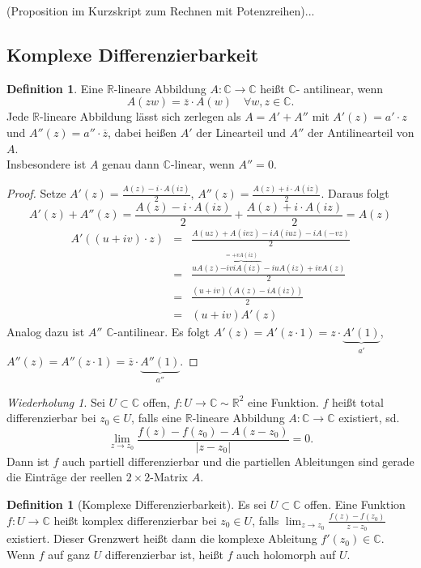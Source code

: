 \documentclass[11pt,titlepage]{article}
\theoremstyle{definition}
\newtheorem{definition}[theorem]{Definition}
\theoremstyle{remark}
\newtheorem*{repetition}{Wiederholung}
\begin{document}
	(Proposition im Kurzskript zum Rechnen mit Potenzreihen)...
	
	\subsection{Komplexe Differenzierbarkeit}
	
	\begin{definition}
		Eine $\mathbb{R}$-lineare Abbildung $A:\mathbb{C}\to \mathbb{C}$ heißt $\mathbb{C}$-
		antilinear, wenn
		\[ A(zw)=\overline{z} \cdot A(w) \quad \forall w,z\in\mathbb{C}. \]
		Jede $\mathbb{R}$-lineare Abbildung lässt sich zerlegen als $A=A'+A''$ mit 
		$A'(z)=a'\cdot z$ und $A''(z)=a''\cdot\overline{z}$, dabei heißen $A'$ der Linearteil und $A''$ 
		der Antilinearteil von $A$.\\
		Insbesondere ist $A$ genau dann $\mathbb{C}$-linear, wenn $A''=0$.
	\end{definition}
	
	\begin{proof}
		Setze $A'(z)=\frac{A(z)-i\cdot A(iz)}{2}$, $A''(z)=\frac{A(z)+i\cdot A(iz)}{2}$. Daraus folgt 
		\[ A'(z) + A''(z)=\frac{A(z)-i\cdot A(iz)}{2}+\frac{A(z)+i\cdot A(iz)}{2}=A(z) \]
		\begin{eqnarray*}
			A'((u+iv)\cdot z)&=&\frac{A(uz)+A(ivz)-iA(iuz)-iA(-vz)}{2} \\
			&=& \frac{uA(z)\overbrace{-iviA(iz)}^{=+vA(iz)}-iuA(iz)+ivA(z)}{2} \\
			&=&\frac{(u+iv)(A(z)-iA(iz))}{2} \\
			&=& (u+iv)A'(z)
		\end{eqnarray*}
		Analog dazu ist $A''$ $\mathbb{C}$-antilinear. Es folgt $A'(z)=A'(z\cdot 1)=z\cdot \underbrace{
		A'(1)}_{a'}$,\\$A''(z)=A''(z\cdot 1)=\overline{z}\cdot\underbrace{A''(1)}_{a''}$.
	\end{proof}
	
	\begin{repetition}
		Sei $U\subset\mathbb{C}$ offen, $f:U\to\mathbb{C}\sim\mathbb{R}^2$ eine Funktion. $f$ 
		heißt total differenzierbar bei $z_0\in U$, falls eine $\mathbb{R}$-lineare Abbildung 
		$A:\mathbb{C}\to\mathbb{C}$ existiert, sd. \[ \lim_{z\to z_0} \frac{f(z)-f(z_0)-A(z-z_0)}
		{|z-z_0 |}=0. \]
		Dann ist $f$ auch partiell differenzierbar und die partiellen Ableitungen sind gerade die Einträge 
		der reellen $2\times 2$-Matrix $A$.
	\end{repetition}
	
	\begin{definition}[Komplexe Differenzierbarkeit]
		Es sei $U\subset \mathbb{C}$ offen. Eine Funktion $f:U\to \mathbb{C}$ heißt komplex 
		differenzierbar bei $z_0\in U$, falls $\lim_{z\to z_0} \frac{f(z)-f(z_0)}{z-z_0}$ existiert. Dieser 
		Grenzwert heißt dann die komplexe Ableitung $f'(z_0)\in\mathbb{C}$. Wenn $f$ auf ganz 
		$U$ differenzierbar ist, heißt $f$ auch holomorph auf $U$.
	\end{definition}
	
\end{document}
